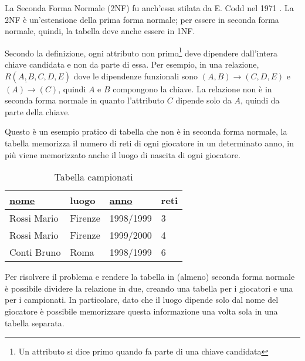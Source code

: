 La Seconda Forma Normale (2NF) fu anch'essa stilata da E. Codd nel 1971 \cite{codd:relationalmodel}. La 2NF è un'estensione della prima forma normale; per essere in seconda forma normale, quindi, la tabella deve anche essere in 1NF.

Secondo la definizione, ogni attributo non primo\footnote{Un attributo si dice primo quando fa parte di una chiave candidata} deve dipendere dall'intera chiave candidata e non da parte di essa. Per esempio, in una relazione, $R(\underline{A,B},C,D,E)$ dove le dipendenze funzionali sono $(A,B) \rightarrow (C,D,E)$ e $(A) \rightarrow (C)$, quindi $A$ e $B$ compongono la chiave. La relazione non è in seconda forma normale in quanto l'attributo $C$ dipende solo da $A$, quindi da parte della chiave.

Questo è un esempio pratico \cite{book:eprogram} di tabella che non è in seconda forma normale, la tabella memorizza il numero di reti di ogni giocatore in un determinato anno, in più viene memorizzato anche il luogo di nascita di ogni giocatore.

\begin{table}
	\centering
	\begin{tabular}{llll}
		\textbf{\underline{nome}}                     & \textbf{luogo}               & \textbf{\underline{anno}}                  & \textbf{reti}          \\ \hline
		\multicolumn{1}{|l|}{Rossi Mario} & \multicolumn{1}{l|}{Firenze} & \multicolumn{1}{l|}{1998/1999} & \multicolumn{1}{l|}{3} \\ \hline
		\multicolumn{1}{|l|}{Rossi Mario} & \multicolumn{1}{l|}{Firenze} & \multicolumn{1}{l|}{1999/2000} & \multicolumn{1}{l|}{4} \\ \hline
		\multicolumn{1}{|l|}{Conti Bruno} & \multicolumn{1}{l|}{Roma}    & \multicolumn{1}{l|}{1998/1999} & \multicolumn{1}{l|}{6} \\ \hline
	\end{tabular}	
	\caption{Tabella campionati}
\end{table}

Per risolvere il problema e rendere la tabella in (almeno) seconda forma normale è possibile dividere la relazione in due, creando una tabella per i giocatori e una per i campionati. In particolare, dato che il luogo dipende solo dal nome del giocatore è possibile memorizzare questa informazione una volta sola in una tabella separata.

